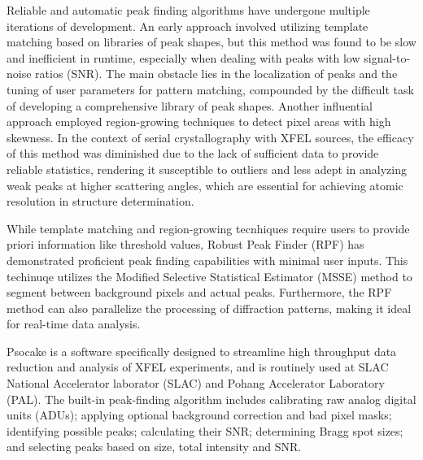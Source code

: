 \documentclass[conference]{IEEEtran}
\newcommand{\psocake}{Psocake}
\begin{document}
Reliable and automatic peak finding algorithms have undergone multiple
iterations of development.  An early approach involved utilizing template
matching \citep{wilkinsonIntegrationSinglecrystalReflections1988a} based on
libraries of peak shapes, but this method was found to be slow and inefficient
in runtime, especially when dealing with peaks with low signal-to-noise ratios
(SNR).  The main obstacle lies in the localization of peaks and the tuning of
user parameters for pattern matching, compounded by the difficult task of
developing a comprehensive library of peak shapes.  Another influential approach
employed region-growing techniques
\citep{bolotovskySeedSkewnessMethodIntegration1995,
bartyCheetahSoftwareHighthroughput2014} to detect pixel areas with high
skewness.  In the context of serial crystallography with XFEL sources, the
efficacy of this method was diminished due to the lack of sufficient data to
provide reliable statistics, rendering it susceptible to outliers and less adept
in analyzing weak peaks at higher scattering angles, which are essential for
achieving atomic resolution in structure determination.

While template matching and region-growing tecnhiques require users to provide
priori information like threshold values, Robust Peak Finder (RPF)
\citep{hadian-jaziPeakfindingAlgorithmBased2017,
hadian-jaziDataReductionSerial2021} has demonstrated proficient peak finding
capabilities with minimal user inputs.  This techinuqe utilizes the Modified
Selective Statistical Estimator (MSSE) method to segment between background
pixels and actual peaks.  Furthermore, the RPF method can also parallelize the
processing of diffraction patterns, making it ideal for real-time data analysis.

\psocake{} is a software specifically designed to streamline high throughput
data reduction and analysis of XFEL experiments, and is routinely used at SLAC
National Accelerator laborator (SLAC) and Pohang Accelerator Laboratory (PAL).
The built-in peak-finding algorithm \citep{shinDataAnalysisUsing2018} includes
calibrating raw analog digital units (ADUs); applying optional background
correction and bad pixel masks; identifying possible peaks; calculating their
SNR; determining Bragg spot sizes; and selecting peaks based on size, total
intensity and SNR.
\end{document}
